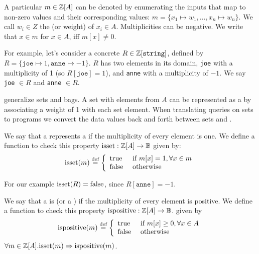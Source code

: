 A particular \zr $m \in \mathbb{Z}[A]$ can be denoted by enumerating the
inputs that map to non-zero values and their corresponding values: 
$m = \{ x_1 \mapsto w_1, \dots, x_n \mapsto w_n \}$.  
We call $w_i \in Z$ the  (or weight)
of $x_i \in A$.  Multiplicities can be negative.  
We write that $x \in m$ for $x \in A$, iff $m[x] \not= 0$.

\ifzsetexamples
For example, let's consider a concrete \zr $R \in \mathbb{Z}[\texttt{string}]$,
defined by $R = \{ \texttt{joe} \mapsto 1, \texttt{anne} \mapsto -1 \}$.  
$R$ has two elements in its domain,
\texttt{joe} with a multiplicity of 1 (so $R[\texttt{joe}] = 1$), 
and \texttt{anne} with a multiplicity of $-1$.
We say \texttt{joe} $\in R$ and \texttt{anne} $\in R$.
\fi

\zrs generalize sets and bags.  A set with elements from $A$
can be represented as a \zr by associating a weight of 1 with each set element.
When translating queries on sets to \dbsp programs we 
convert the data values back and forth between sets and \zrs.

\begin{definition}
We say that a \zr represents a  if the multiplicity of every
element is one.  We define a function to check this property 
$\mbox{isset} : \mathbb{Z}[A] \rightarrow \mathbb{B}$
given by:
$$\mbox{isset}(m) \stackrel{\textrm{\scriptsize def}}{=} \left\{
\begin{array}{ll}
  \mbox{true} & \mbox{ if } m[x] = 1, \forall x \in m \\
  \mbox{false} & \mbox{ otherwise}
\end{array}
\right.
$$
\end{definition}

\ifzsetexamples
For our example $\mbox{isset}(R) = \mbox{false}$, since $R[\texttt{anne}] = -1$.  
\fi

\begin{definition}
We say that a \zr is  (or a ) if the multiplicity of every element is
positive.  We define a function to check this property
$\mbox{ispositive} : \mathbb{Z}[A] \rightarrow \mathbb{B}$.
given by
$$\mbox{ispositive}(m) \stackrel{\textrm{\scriptsize def}}{=} \left\{
\begin{array}{ll}
  \mbox{true} & \mbox{ if } m[x] \geq 0, \forall x \in A \\
  \mbox{false} & \mbox{ otherwise}
\end{array}
\right.$$
$\forall m \in \mathbb{Z}[A] . \mbox{isset}(m) \Rightarrow \mbox{ispositive}(m)$.
\end{definition}

